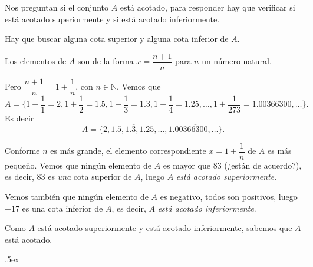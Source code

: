 \documentclass[12pt,letterpaper]{article}
\newcommand{\fej}{\relax\hfill\ifmmode{\lower.5ex\hbox{{\textcolor{blue}{\LARGE\smiley al 15pt}}}}\else\lower.5ex\hbox{{\textcolor{blue}{\LARGE \smiley}}}}  %
\begin{document}
Nos preguntan si el conjunto $A$ está acotado, para responder hay que verificar si está acotado superiormente y si está acotado inferiormente.

Hay que buscar alguna cota superior y alguna cota inferior de $A$.

Los elementos de $A$ son de la forma $x=\dfrac{n+1}{n}$ para $n$ un número natural. 

Pero $\dfrac{n+1}{n}=1+\dfrac{1}{n}$, con $n\in\mathbb N$. Vemos que
$$A=\bigl\{1+\frac{1}{1}=2, 1+\frac{1}{2}=1.5, 1+\frac{1}{3}=1.\overline3, 1+\frac{1}{4}=1.25,\ldots, 1+\frac{1}{273}=1.00\overline{366300}, \ldots\bigr\}.$$
Es decir
$$A=\{2, 1.5, 1.\overline3, 1.25, \ldots, 1.00\overline{366300}, \ldots\}.$$

Conforme $n$ es más grande, el elemento correspondiente $x=1+\dfrac{1}{n}$ de $A$ es más pequeño. Vemos que ningún elemento de $A$ es mayor que $83$ (¿están de acuerdo?), es decir, $83$ es \emph{una} cota superior de $A$, luego $A$ \emph{está acotado superiormente}.

Vemos también que ningún elemento de $A$ es negativo, todos son positivos, luego $-17$ es una cota inferior de $A$, es decir, $A$ \emph{está acotado inferiormente}.

Como $A$ está acotado superiormente y está acotado inferiormente, sabemos que {\color{purple}$A$ está acotado}.

\fej
\end{document}
